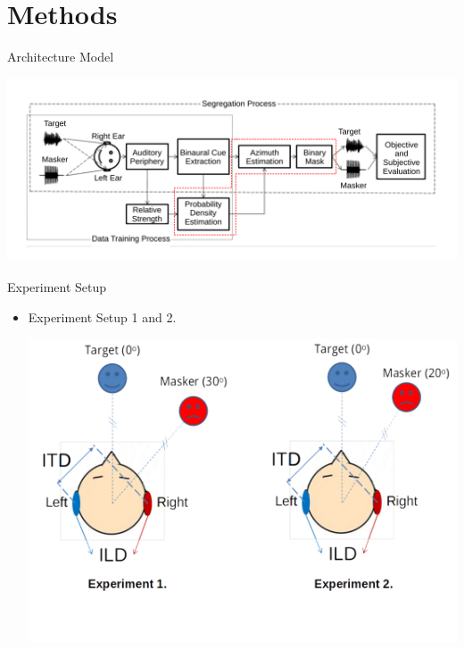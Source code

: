 \documentclass{beamer}
\begin{document}
\section{Methods}
\begin{frame}[t]{Architecture Model}
\begin{center}
	\includegraphics[scale=0.4]{../pict/model_architecture.pdf}
\end{center}
\end{frame}

\begin{frame}[t]{Experiment Setup}
\begin{itemize}
\item Experiment Setup 1 and 2.
\begin{center}
	\includegraphics[scale=0.3]{../pict/exp1-2.png}
\end{center}
\end{itemize}
\end{frame}
\end{document}
